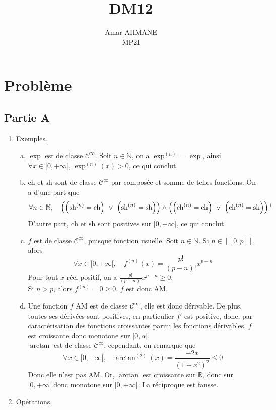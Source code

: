 \documentclass[17pt]{article}
\title{DM12}
\author{Amar AHMANE\\ MP2I}
\def\N{\mathbb N}
\def\R{\mathbb R}
\def\Cinf{\mathcal{C}^{\infty}}
\def\sh{\text{sh}}
\def\ch{\text{ch}}
\begin{document}
	\maketitle
	
	\section*{Problème}
	\subsection*{Partie A}
	\begin{enumerate}
		\item \underline{Exemples.}
		\begin{enumerate}[a)]
			\item $\exp$ est de classe $\Cinf$. Soit $n\in\N$, on a $\exp^{(n)}=\exp$, ainsi $\forall x\in[0,+\infty[$, $\exp^{(n)}(x)>0$, ce qui conclut.
			\item $\ch$ et $\sh$ sont de classe $\Cinf$ par composée et somme de telles fonctions. On a d'une part que \[\forall n\in\N,\quad \left(\left(\sh^{(n)}=\ch\right)\ \vee\ \left(\sh^{(n)}=\sh\right)\right)\wedge\left(\left(\ch^{(n)}=\ch\right)\ \vee\ \left(\ch^{(n)}=\sh\right)\right)\footnotemark[1]\]
			D'autre part, $\ch$ et $\sh$ sont positives sur $[0,+\infty[$, ce qui conclut.
			\item $f$ est de classe $\Cinf$, puisque fonction usuelle. Soit $n\in\N$. Si $n\in[\![0,p]\!]$, alors \[\forall x\in[0,+\infty[,\quad f^{(n)}(x)=\frac{p!}{(p-n)!}x^{p-n}\]
			Pour tout $x$ réel positif, on a $\frac{p!}{(p-n)!}x^{p-n}\geq 0$.\\
			Si $n>p$, alors $f^{(n)}=0\geq 0$. $f$ est donc AM.
			\item Une fonction $f$ AM est de classe $\Cinf$, elle est donc dérivable. De plus, toutes ses dérivées sont positives, en particulier $f'$ est positive, donc, par caractérisation des fonctions croissantes parmi les fonctions dérivables, $f$ est croissante donc monotone sur $[0,\alpha[$.\\
			$\arctan$ est de classe $\Cinf$, cependant, on remarque que \[\forall x\in[0,+\infty[,\quad \arctan^{(2)}(x)=\frac{-2x}{(1+x^2)^2}\leq 0\]
			Donc elle n'est pas AM. Or, $\arctan$ est croissante sur $\R$, donc sur $[0,+\infty[$ donc monotone sur $[0,+\infty[$. La réciproque est fausse.
		\end{enumerate}
		\item \underline{Opérations.}
		\begin{enumerate}[a)]

\end{enumerate}
\end{enumerate}
\end{document}
